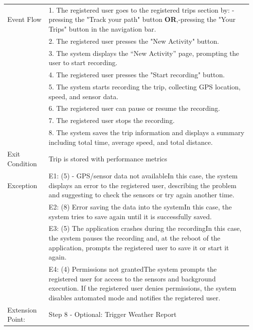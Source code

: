 \begin{enumerate}[label=\textbf{[UC\arabic*]}]
\begin{center}
\begin{tabular}{|p{4cm}|p{11cm}|}
                \hline
                Event Flow & 1. The registered user goes to the registered trips section by: \newline -pressing the "Track your path" button \textbf{OR},\newline -pressing the "Your Trips" button in the navigation bar.\\
                & 2. The registered user presses the "New Activity" button. \\
                & 3. The system displays the “New Activity” page, prompting the user to start recording.\\
                & 4. The registered user presses the "Start recording" button. \\
                & 5. The system starts recording the trip, collecting GPS location, speed, and sensor data. \\
                & 6. The registered user can pause or resume the recording. \\
                & 7. The registered user stops the recording. \\
                & 8. The system saves the trip information and displays a summary including total time, average speed, and total distance. \\
                \hline
                Exit Condition & Trip is stored with performance metrics \\
                \hline
                Exception & E1: (5) - GPS/sensor data not available\newline In this case, the system displays an error to the registered user, describing the problem and suggesting to check the sensors or try again another time. \\
                & E2: (8) Error saving the data into the system\newline In this case, the system tries to save again until it is successfully saved. \\
                & E3: (5) The application crashes during the recording\newline In this case, the system pauses the recording and, at the reboot of the application, prompts the registered user to save it or start it again. \\
                & E4: (4) Permissions not granted\newline The system prompts the registered user for access to the sensors and background execution. If the registered user denies permissions, the system disables automated mode and notifies the registered user.\\
                \hline
                Extension Point: & Step 8 - Optional: Trigger Weather Report\\
                \hline
            \end{tabular}
        \end{center} 


\end{enumerate}
